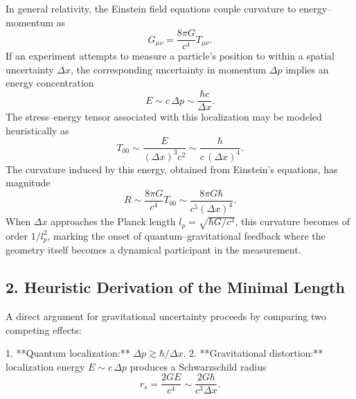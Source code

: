 \documentclass[11pt,oneside]{book}
\numberwithin{equation}{chapter}
\begin{document}
In general relativity, the Einstein field equations couple curvature to energy–momentum as
\begin{equation}
G_{\mu\nu} = \frac{8\pi G}{c^4}T_{\mu\nu}.
\end{equation}
If an experiment attempts to measure a particle’s position to within a spatial uncertainty $\Delta x$, the corresponding uncertainty in momentum $\Delta p$ implies an energy concentration
\begin{equation}
E \sim c\,\Delta p \sim \frac{\hbar c}{\Delta x}.
\end{equation}
The stress–energy tensor associated with this localization may be modeled heuristically as
\begin{equation}
T_{00} \sim \frac{E}{(\Delta x)^3 c^2} 
\sim \frac{\hbar}{c\,(\Delta x)^4}.
\end{equation}
The curvature induced by this energy, obtained from Einstein’s equations, has magnitude
\begin{equation}
R \sim \frac{8\pi G}{c^4}T_{00}
\sim \frac{8\pi G\hbar}{c^5(\Delta x)^4}.
\end{equation}
When $\Delta x$ approaches the Planck length $l_p = \sqrt{\hbar G/c^3}$, this curvature becomes of order $1/l_p^2$, marking the onset of quantum–gravitational feedback where the geometry itself becomes a dynamical participant in the measurement.

\subsection*{2. Heuristic Derivation of the Minimal Length}

A direct argument for gravitational uncertainty proceeds by comparing two competing effects:

1. **Quantum localization:** $\Delta p \gtrsim \hbar / \Delta x$.
2. **Gravitational distortion:** localization energy $E \sim c\,\Delta p$ produces a Schwarzschild radius 
   \begin{equation}
   r_s = \frac{2GE}{c^4} \sim \frac{2G\hbar}{c^3\Delta x}.
   \end{equation}
\end{document}
